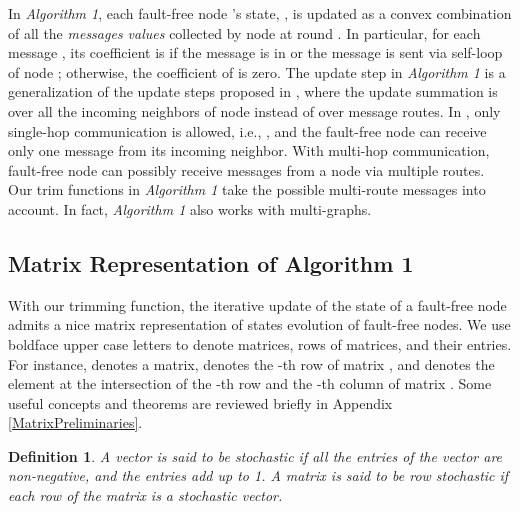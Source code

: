 \documentclass[letterpaper, 11pt]{article}
\newtheorem{definition}{Definition}[section]
\begin{document}
In \emph {Algorithm 1}, each fault-free node 's state, ,  is updated as a convex combination of all the \emph{messages values} collected by node  at round . In particular, for each message , its coefficient is  if the message is in  or the message is sent via self-loop of node ; otherwise, the coefficient of  is zero.
The update step in \emph {Algorithm 1} is a generalization of the update steps proposed in \cite{Vaidyamatrix,IBA_broadcast_Sundaram}, where the update summation is over all the incoming neighbors of node  instead of over message routes. In \cite{Vaidyamatrix,IBA_broadcast_Sundaram}, only single-hop communication is allowed, i.e., , and the fault-free node  can receive only one message from its incoming neighbor. With multi-hop communication, fault-free node can possibly receive messages from a node via multiple routes. Our trim functions in \emph {Algorithm 1} take the possible multi-route messages into account. In fact, \emph {Algorithm 1} also works with multi-graphs.







\subsection{Matrix Representation of Algorithm 1}
\label{s_claim}

With our trimming function, the iterative update of the state
of a fault-free node  admits a nice matrix representation of states evolution of fault-free nodes.  We use boldface upper case letters to denote matrices, rows of matrices, and their entries. For instance,  denotes a matrix,  denotes the -th row of matrix , and  denotes the element at the intersection of the -th row and the -th column of matrix . Some useful concepts and theorems are reviewed briefly in Appendix \ref{MatrixPreliminaries}.

\begin{definition}
\label{d_stochastic}
A vector is said to be {\em stochastic} if all the entries
of the vector are {\em non-negative}, and the entries add up to 1.
A matrix is said to be row stochastic if each row of the matrix is a
stochastic vector.
\end{definition}
\end{document}
